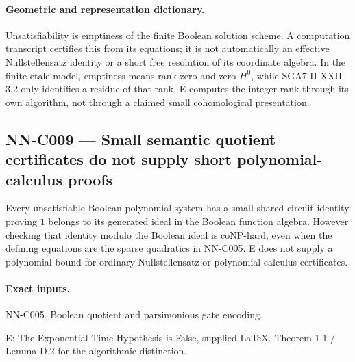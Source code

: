 \paragraph{Geometric and representation dictionary.}
Unsatisfiability is emptiness of the finite Boolean solution scheme. A computation transcript certifies this from its equations; it is not automatically an effective Nullstellensatz identity or a short free resolution of its coordinate algebra. In the finite etale model, emptiness means rank zero and zero $H^0$, while SGA7 II XXII 3.2 only identifies a residue of that rank. E computes the integer rank through its own algorithm, not through a claimed small cohomological presentation.

\subsection{NN-C009 --- Small semantic quotient certificates do not supply short polynomial-calculus proofs}
\begin{proposition}[NN-C009]
Every unsatisfiable Boolean polynomial system has a small shared-circuit identity proving $1$ belongs to its generated ideal in the Boolean function algebra. However checking that identity modulo the Boolean ideal is coNP-hard, even when the defining equations are the sparse quadratics in NN-C005. E does not supply a polynomial bound for ordinary Nullstellensatz or polynomial-calculus certificates.
\end{proposition}
\paragraph{Exact inputs.}
NN-C005. Boolean quotient and parsimonious gate encoding.

E: The Exponential Time Hypothesis is False, supplied LaTeX. Theorem 1.1 / Lemma D.2 for the algorithmic distinction.

